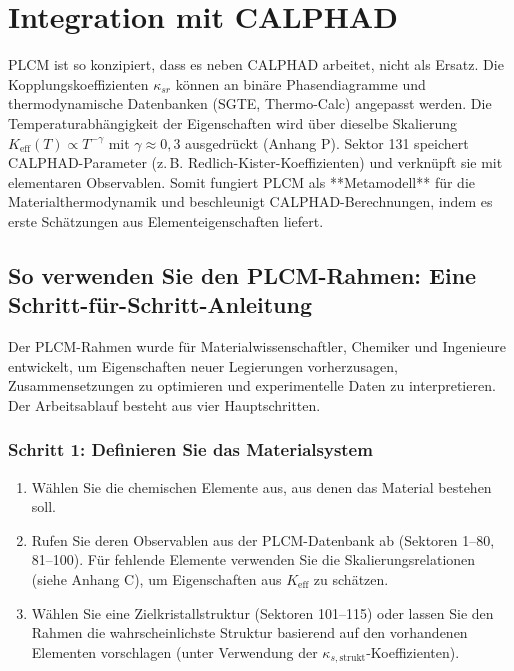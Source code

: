\documentclass[12pt,a4paper]{article}
\newcommand{\Keff}{K_{\mathrm{eff}}}
\begin{document}
\section{Integration mit CALPHAD}

PLCM ist so konzipiert, dass es neben CALPHAD arbeitet, nicht als Ersatz. Die Kopplungskoeffizienten \(\kappa_{sr}\) können an binäre Phasendiagramme und thermodynamische Datenbanken (SGTE, Thermo-Calc) angepasst werden. Die Temperaturabhängigkeit der Eigenschaften wird über dieselbe Skalierung \(\Keff(T) \propto T^{-\gamma}\) mit \(\gamma \approx 0,3\) ausgedrückt (Anhang P). Sektor 131 speichert CALPHAD-Parameter (z. B. Redlich-Kister-Koeffizienten) und verknüpft sie mit elementaren Observablen. Somit fungiert PLCM als **Metamodell** für die Materialthermodynamik und beschleunigt CALPHAD-Berechnungen, indem es erste Schätzungen aus Elementeigenschaften liefert.

\subsection{So verwenden Sie den PLCM-Rahmen: Eine Schritt-für-Schritt-Anleitung}

Der PLCM-Rahmen wurde für Materialwissenschaftler, Chemiker und Ingenieure entwickelt, um Eigenschaften neuer Legierungen vorherzusagen, Zusammensetzungen zu optimieren und experimentelle Daten zu interpretieren. Der Arbeitsablauf besteht aus vier Hauptschritten.

\subsubsection{Schritt 1: Definieren Sie das Materialsystem}

\begin{enumerate}
	\item Wählen Sie die chemischen Elemente aus, aus denen das Material bestehen soll.
	\item Rufen Sie deren Observablen aus der PLCM-Datenbank ab (Sektoren 1–80, 81–100). Für fehlende Elemente verwenden Sie die Skalierungsrelationen (siehe Anhang C), um Eigenschaften aus \(\Keff\) zu schätzen.
	\item Wählen Sie eine Zielkristallstruktur (Sektoren 101–115) oder lassen Sie den Rahmen die wahrscheinlichste Struktur basierend auf den vorhandenen Elementen vorschlagen (unter Verwendung der \(\kappa_{s,\text{strukt}}\)-Koeffizienten).
\end{enumerate}
\end{document}
